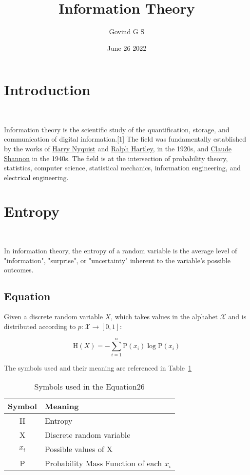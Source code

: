 \documentclass{article}
\title{Information Theory}
\author{Govind G S}
\date{June 26 2022}
\begin{document}
\maketitle

\section{Introduction}\

Information theory is the scientific study of the quantification, storage, and communication of digital information.[1] The field was fundamentally established by the works of \href{https://en.wikipedia.org/wiki/Harry_Nyquist}{Harry Nyquist} and \href{https://en.wikipedia.org/wiki/Ralph_Hartley}{Ralph Hartley}, in the 1920s, and \href{https://en.wikipedia.org/wiki/Claude_Shannon}{Claude Shannon} in the 1940s. The field is at the intersection of probability theory, statistics, computer science, statistical mechanics, information engineering, and electrical engineering. 

\section{Entropy}\

In information theory, the entropy of a random variable is the average level of "information", "surprise", or "uncertainty" inherent to the variable's possible outcomes.

\subsection{Equation}

Given a discrete random variable $X$, which takes values in the alphabet $\mathcal{X}$ and is distributed according to $p:{\mathcal{X}}\to [0,1]$: 

\[
\textrm{H} (X) = - \sum_{i=1}^{n} {\textrm{P} (x_{i})\log \textrm{P} (x_{i})}
\]

The symbols used and their meaning are referenced in Table~\ref{tab:SiE}

\begin{table}
\centering
\begin{tabular}{|c|l|}
\hline
Symbol & Meaning \\\hline
H & Entropy \\
X & Discrete random variable \\
$x_i$ & Possible values of X \\
P & Probability Mass Function of each $x_i$ \\
\hline
\end{tabular}
\caption{\label{tab:SiE}Symbols used in the Equation26 }
\end{table}
\end{document}
